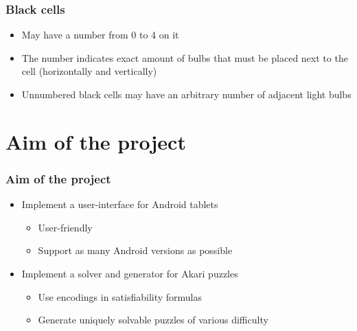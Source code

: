\documentclass[xcolor=dvipsnames]{beamer}
\begin{document}
\begin{frame}
  \frametitle{Black cells}
  \begin{itemize}
  \item May have a number from 0 to 4 on it 
  \item The number indicates exact amount of bulbs that must be placed next to the cell (horizontally and vertically)
  \item Unnumbered black cells may have an arbitrary number of adjacent light bulbs
  \end{itemize}
\end{frame}



\section{Aim of the project}
\begin{frame}
  \frametitle{Aim of the project}
  \begin{itemize}
  \item Implement a user-interface for Android tablets
    \begin{itemize}
    \item User-friendly
    \item Support as many Android versions as possible
    \end{itemize}
  \item Implement a solver and generator for Akari puzzles
    \begin{itemize}
    \item Use encodings in satisfiability formulas
    \item Generate uniquely solvable puzzles of various difficulty 
    \end{itemize}
  \end{itemize}
\end{frame}

\end{document}
